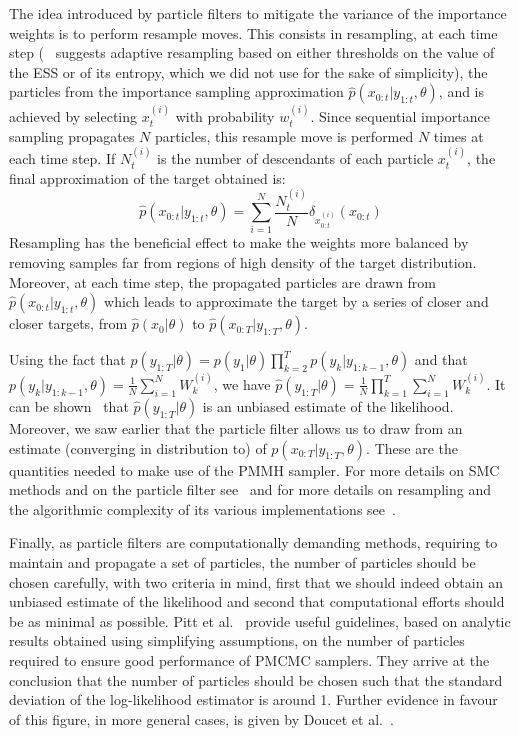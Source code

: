 \documentclass[12pt]{article}
\begin{document}
	The idea introduced by particle filters to mitigate the variance of the importance weights is to perform resample moves. This consists in resampling, at each time step (~\cite{doucet2009tutorial} suggests adaptive resampling based on either thresholds on the value of the ESS or of its entropy, which we did not use for the sake of simplicity), the particles from the importance sampling approximation $\hat{p}(x_{0:t}|y_{1:t}, \theta)$, and is achieved by selecting $x_t^{(i)}$ with probability $w_t^{(i)}$. Since sequential importance sampling propagates $N$ particles, this resample move is performed $N$ times at each time step. If $N_t^{(i)}$ is the number of descendants of each particle $x_t^{(i)}$, the final approximation of the target obtained is:
	\begin{equation*}
 	\hat{p}(x_{0:t}|y_{1:t}, \theta) = \sum_{i=1}^{N}\frac{N_t^{(i)}}{N} \delta_{x_{0:t}^{(i)}}(x_{0:t})
	\end{equation*}
	Resampling has the beneficial effect to make the weights more balanced by removing samples far from regions of high density of the target distribution. Moreover, at each time step, the propagated particles are drawn from $\hat{p}(x_{0:t}|y_{1:t}, \theta)$ which leads to approximate the target by a series of closer and closer targets, from $\hat{p}(x_0|\theta)$ to $\hat{p}(x_{0:T}|y_{1:T}, \theta)$. 
	 
	Using the fact that $p(y_{1:T}| \theta) = p(y_1|\theta)\prod_{k=2}^{T}p(y_k|y_{1:k-1}, \theta)$ and that \\
	$p(y_k|y_{1:k-1}, \theta) = \frac{1}{N}\sum_{i=1}^{N}W_k^{(i)}$, we have $\hat{p}(y_{1:T}| \theta)=\frac{1}{N}\prod_{k=1}^{T}\sum_{i=1}^{N}W_k^{(i)}$. It can be shown~\cite{del2004feynman} that $\hat{p}(y_{1:T}| \theta)$ is an unbiased estimate of the likelihood. Moreover, we saw earlier that the particle filter allows us to draw from an estimate (converging in distribution to) of $p(x_{0:T}|y_{1:T}, \theta)$. These are the quantities needed to make use of the PMMH sampler. For more details on SMC methods and on the particle filter see~\cite{doucet2009tutorial} and for more details on resampling and the algorithmic complexity of its various implementations see~\cite{murray2013parallel}.
	
	Finally, as particle filters are computationally demanding methods, requiring to maintain and propagate a set of particles, the number of particles should be chosen carefully, with two criteria in mind, first that we should indeed obtain an unbiased estimate of the likelihood and second that computational efforts should be as minimal as possible. Pitt et al.~\cite{pitt2012some} provide useful guidelines, based on analytic results obtained using simplifying assumptions, on the number of particles required to ensure good performance of PMCMC samplers. They arrive at the conclusion that the number of particles should be chosen such that the standard deviation of the log-likelihood estimator is around 1. Further evidence in favour of this figure, in more general cases, is given by Doucet et al.~\cite{doucet2015efficient}.
	
\end{document}
